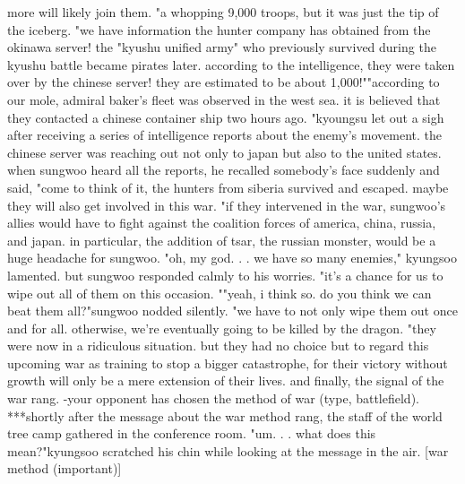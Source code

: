  more will likely join them.
"a whopping 9,000 troops, but it was just the tip of the iceberg.
"we have information the hunter company has obtained from the okinawa server! the "kyushu unified army" who previously survived during the kyushu battle became pirates later.
 according to the intelligence, they were taken over by the chinese server! they are estimated to be about 1,000!""according to our mole, admiral baker's fleet was observed in the west sea.
 it is believed that they contacted a chinese container ship two hours ago.
"kyoungsu let out a sigh after receiving a series of intelligence reports about the enemy's movement.
 the chinese server was reaching out not only to japan but also to the united states.
 when sungwoo heard all the reports, he recalled somebody's face suddenly and said, "come to think of it, the hunters from siberia survived and escaped.
 maybe they will also get involved in this war.
"if they intervened in the war, sungwoo's allies would have to fight against the coalition forces of america, china, russia, and japan.
in particular, the addition of tsar, the russian monster, would be a huge headache for sungwoo.
"oh, my god.
.
.
 we have so many enemies," kyungsoo lamented.
 but sungwoo responded calmly to his worries.
"it's a chance for us to wipe out all of them on this occasion.
""yeah, i think so.
 do you think we can beat them all?"sungwoo nodded silently.
"we have to not only wipe them out once and for all.
 otherwise, we're eventually going to be killed by the dragon.
"they were now in a ridiculous situation.
 but they had no choice but to regard this upcoming war as training to stop a bigger catastrophe, for their victory without growth will only be a mere extension of their lives.
and finally, the signal of the war rang.
-your opponent has chosen the method of war (type, battlefield).
***shortly after the message about the war method rang, the staff of the world tree camp gathered in the conference room.
"um.
.
.
 what does this mean?"kyungsoo scratched his chin while looking at the message in the air.
[war method (important)]

